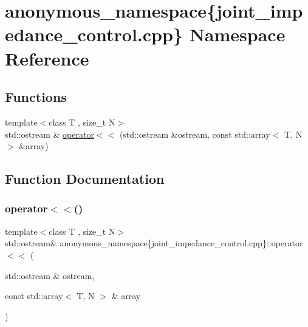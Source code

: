 \hypertarget{namespaceanonymous__namespace_02joint__impedance__control_8cpp_03}{}\section{anonymous\+\_\+namespace\{joint\+\_\+impedance\+\_\+control.\+cpp\} Namespace Reference}
\label{namespaceanonymous__namespace_02joint__impedance__control_8cpp_03}
\subsection*{Functions}
\begin{DoxyCompactItemize}
\item 
{\footnotesize template$<$class T , size\+\_\+t N$>$ }\\std\+::ostream \& \hyperlink{namespaceanonymous__namespace_02joint__impedance__control_8cpp_03_ae1565e96067de4a883d5ca08e7bc5fec}{operator$<$$<$} (std\+::ostream \&ostream, const std\+::array$<$ T, N $>$ \&array)
\end{DoxyCompactItemize}


\subsection{Function Documentation}
\mbox{\label{namespaceanonymous__namespace_02joint__impedance__control_8cpp_03_ae1565e96067de4a883d5ca08e7bc5fec}} 
\subsubsection{\texorpdfstring{operator$<$$<$()}{operator<<()}}
{\footnotesize\ttfamily template$<$class T , size\+\_\+t N$>$ \\
std\+::ostream\& anonymous\+\_\+namespace\{joint\+\_\+impedance\+\_\+control.\+cpp\}\+::operator$<$$<$ (\begin{DoxyParamCaption}\item[{std\+::ostream \&}]{ostream,  }\item[{const std\+::array$<$ T, N $>$ \&}]{array }\end{DoxyParamCaption})}



